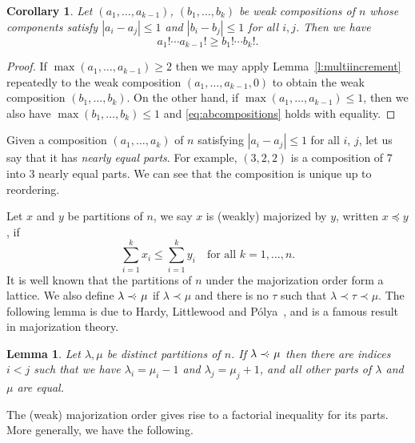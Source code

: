 \documentclass[12pt]{amsart}
\newtheorem{cor}[thm]{Corollary}
\newtheorem{lem}[thm]{Lemma}
\theoremstyle{definition}
\numberwithin{equation}{section}
\newcommand{\precdot}{\prec \negthickspace \negthinspace \cdot\ }
\begin{document}
\begin{cor}\label{c:max central multi}
    Let $(a_1,\dotsc,a_{k-1})$, $(b_1,\dotsc,b_{k})$ be weak compositions of $n$
    whose components satisfy $|a_i-a_j| \leq 1$ and $|b_i-b_j| \leq 1$ for all $i, j$. Then we have
    \begin{equation}\label{eq:abcompositions}
        a_1! \cdots a_{k-1}! \geq b_1!\cdots b_{k}!.
    \end{equation}
\end{cor}
\begin{proof}
If $\max(a_1,\dotsc,a_{k-1}) \geq 2$ then
we may apply Lemma~\ref{l:multiincrement} repeatedly to the weak composition $(a_1,\dotsc, a_{k-1},0)$ to obtain
the weak composition $(b_1,\dotsc,b_k)$.
On the other hand, if $\max(a_1,\dotsc,a_{k-1}) \leq 1$, then we also have $\max(b_1,\dotsc,b_k) \leq 1$ and \eqref{eq:abcompositions} holds with equality.
\end{proof}

Given a composition $(a_1,\dotsc,a_k)$ of $n$ satisfying $|a_i - a_j| \leq 1$ for all $i$, $j$, let us say that it has {\em nearly equal parts}. For example, $(3,2,2)$ is a composition of $7$ into $3$ nearly equal parts. We can see that the composition is unique up to reordering.

Let $x$ and $y$ be partitions of $n$, we say $x$ is (weakly) majorized by $y$, written $x \preceq y$, if \begin{equation*}\sum_{i=1}^{k} x_i \leq \sum_{i=1}^k y_i \quad \text{for all $k = 1,\dotsc,n$.}\end{equation*}
It is well known that the partitions of $n$ under the majorization order form a lattice. We also define $\lambda \precdot \mu$ if $\lambda \prec \mu$ and there is no $\tau$ such that $\lambda \prec \tau \prec \mu$.
The following lemma is due to Hardy, Littlewood and Pólya~\cite{MOA2011}, and is a famous result in majorization theory.
\begin{lem}\label{l:majorize}
Let $\lambda, \mu$ be distinct partitions of $n$. If $\lambda \precdot \mu$ then there are indices $i < j$ such that we have
$\lambda_i = \mu_i - 1$ and $\lambda_j = \mu_j + 1$, and all other parts of $\lambda$ and $\mu$ are equal.
\end{lem}

The (weak) majorization order gives rise to a factorial inequality for its parts. More generally, we have the following.
\end{document}
